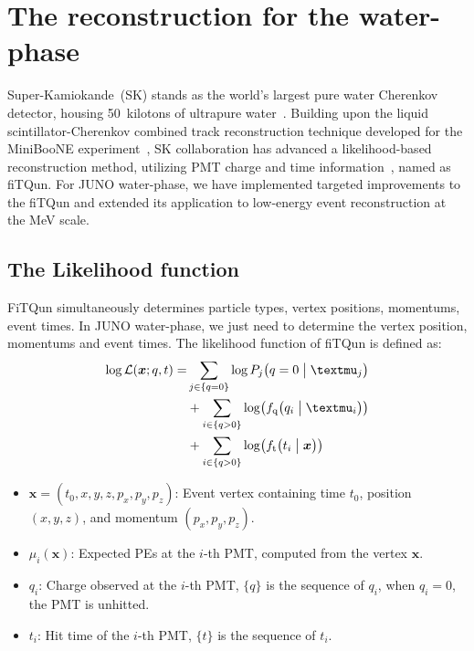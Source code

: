 
\chapter{The reconstruction for the water-phase}
Super-Kamiokande~(SK) stands as the world's largest pure water Cherenkov detector, housing \SI{50}{kilotons} of ultrapure water~\cite{SK}. Building upon the liquid scintillator-Cherenkov combined track reconstruction technique developed for the MiniBooNE experiment~\cite{minibone}, SK collaboration has advanced a likelihood-based reconstruction method, utilizing PMT charge and time information~\cite{SKfiTQun}, named as fiTQun. For JUNO water-phase, we have implemented targeted improvements to the fiTQun and extended its application to low-energy event reconstruction at the \si{MeV} scale.

\section{The Likelihood function}
FiTQun simultaneously determines particle types, vertex positions, momentums, event times.
In JUNO water-phase, we just need to determine the vertex position, momentums and event times.
The likelihood function of fiTQun is defined as:
\begin{equation}
	\begin{aligned}
		\log \mathcal{L}(\boldsymbol{x};{q},{t}) = & \sum_{j \in \{q=0\}} \log P_j \bigl( q=0\bigm| \mu_j \bigr)                                      \\
		                                           & + \sum_{i \in \{q>0\}} \log \bigl( f_{\mathrm{q}}\bigl( q_i \bigm| \mu_i \bigr) \bigr)           \\
		                                           & + \sum_{i \in \{q>0\}} \log \bigl( f_{\mathrm{t}} \bigl( t_i \bigm| \boldsymbol{x} \bigr) \bigr)
	\end{aligned}
\end{equation}
\begin{itemize}
	\item $\boldsymbol{x} = (t_0, x, y, z, p_x, p_y, p_z)$: Event vertex containing time $t_0$, position $(x,y,z)$, and momentum $(p_x,p_y,p_z)$.
	\item $\mu_i(\boldsymbol{x})$: Expected PEs at the $i$-th PMT, computed from the vertex $\boldsymbol{x}$.
	\item $q_i$: Charge observed at the $i$-th PMT, $\{q\}$ is the sequence of $q_i$, when $q_i=0$, the PMT is unhitted.
	\item $t_i$: Hit time of the $i$-th PMT, $\{t\}$ is the sequence of $t_i$.
\end{itemize}

